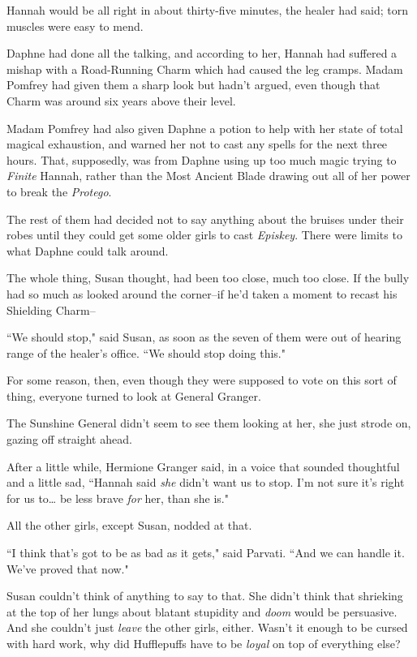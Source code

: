 Hannah would be all right in about thirty-five minutes, the healer had said; torn muscles were easy to mend.

Daphne had done all the talking, and according to her, Hannah had suffered a mishap with a Road-Running Charm which had caused the leg cramps. Madam Pomfrey had given them a sharp look but hadn't argued, even though that Charm was around six years above their level.

Madam Pomfrey had also given Daphne a potion to help with her state of total magical exhaustion, and warned her not to cast any spells for the next three hours. That, supposedly, was from Daphne using up too much magic trying to \emph{Finite} Hannah, rather than the Most Ancient Blade drawing out all of her power to break the \emph{Protego}.

The rest of them had decided not to say anything about the bruises under their robes until they could get some older girls to cast \emph{Episkey}. There were limits to what Daphne could talk around.

The whole thing, Susan thought, had been too close, much too close. If the bully had so much as looked around the corner\---if he'd taken a moment to recast his Shielding Charm\---

``We should stop," said Susan, as soon as the seven of them were out of hearing range of the healer's office. ``We should stop doing this."

For some reason, then, even though they were supposed to vote on this sort of thing, everyone turned to look at General Granger.

The Sunshine General didn't seem to see them looking at her, she just strode on, gazing off straight ahead.

After a little while, Hermione Granger said, in a voice that sounded thoughtful and a little sad, ``Hannah said \emph{she} didn't want us to stop. I'm not sure it's right for us to{\ldots} be less brave \emph{for} her, than she is."

All the other girls, except Susan, nodded at that.

``I think that's got to be as bad as it gets," said Parvati. ``And we can handle it. We've proved that now."

Susan couldn't think of anything to say to that. She didn't think that shrieking at the top of her lungs about blatant stupidity and \emph{doom} would be persuasive. And she couldn't just \emph{leave} the other girls, either. Wasn't it enough to be cursed with hard work, why did Hufflepuffs have to be \emph{loyal} on top of everything else?

